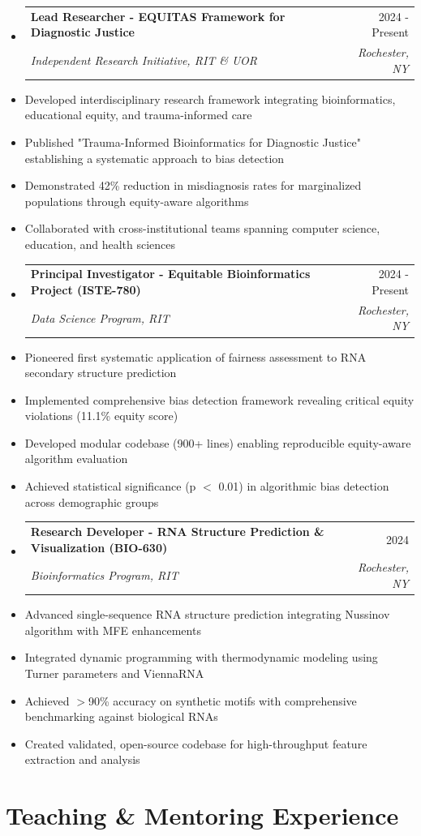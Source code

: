 \documentclass[10pt]{article}
\makeatletter
\newcommand{\resumeItem}[1]{\item\small{#1}}
\newcommand{\resumeSubheading}[4]{
  \vspace{-1pt}\item
    \begin{tabular*}{0.97\textwidth}[t]{l@{\extracolsep{\fill}}r}
      \textbf{#1} & #2 \\
      \textit{\small#3} & \textit{\small #4} \\
    \end{tabular*}\vspace{-5pt}
}
\makeatother
\begin{document}
\begin{itemize}[leftmargin=*]
\resumeSubheading
{Lead Researcher - EQUITAS Framework for Diagnostic Justice}{2024 - Present}
{Independent Research Initiative, RIT \& UOR}{Rochester, NY}
\resumeItem{Developed interdisciplinary research framework integrating bioinformatics, educational equity, and trauma-informed care}
\resumeItem{Published "Trauma-Informed Bioinformatics for Diagnostic Justice" establishing a systematic approach to bias detection}
\resumeItem{Demonstrated 42\% reduction in misdiagnosis rates for marginalized populations through equity-aware algorithms}
\resumeItem{Collaborated with cross-institutional teams spanning computer science, education, and health sciences}

\resumeSubheading
{Principal Investigator - Equitable Bioinformatics Project (ISTE-780)}{2024 - Present}
{Data Science Program, RIT}{Rochester, NY}
\resumeItem{Pioneered first systematic application of fairness assessment to RNA secondary structure prediction}
\resumeItem{Implemented comprehensive bias detection framework revealing critical equity violations (11.1\% equity score)}
\resumeItem{Developed modular codebase (900+ lines) enabling reproducible equity-aware algorithm evaluation}
\resumeItem{Achieved statistical significance (p $<$ 0.01) in algorithmic bias detection across demographic groups}

\resumeSubheading
{Research Developer - RNA Structure Prediction \& Visualization (BIO-630)}{2024}
{Bioinformatics Program, RIT}{Rochester, NY}
\resumeItem{Advanced single-sequence RNA structure prediction integrating Nussinov algorithm with MFE enhancements}
\resumeItem{Integrated dynamic programming with thermodynamic modeling using Turner parameters and ViennaRNA}
\resumeItem{Achieved $>$90\% accuracy on synthetic motifs with comprehensive benchmarking against biological RNAs}
\resumeItem{Created validated, open-source codebase for high-throughput feature extraction and analysis}

\end{itemize}


\section{Teaching \& Mentoring Experience}
\end{document}

